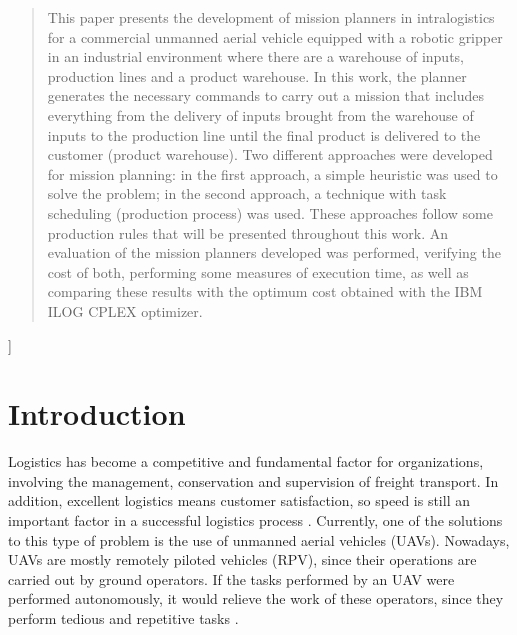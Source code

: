 \documentclass[conference,harvard,brazil,english]{sbatex}
\begin{document}
\begin{abstract}
 This paper presents the development of mission planners in intralogistics for a commercial unmanned aerial vehicle equipped with a robotic gripper in an industrial environment where there are a warehouse of inputs, production lines and a product warehouse. In this work, the planner generates the necessary commands to carry out a mission that includes everything from the delivery of inputs brought from the warehouse of inputs to the production line until the final product is delivered to the customer (product warehouse). Two different approaches were developed for mission planning: in the first approach, a simple heuristic was used to solve the problem; in the second approach, a technique with task scheduling (production process) was used. These approaches follow some production rules that will be presented throughout this work. An evaluation of the mission planners developed was performed, verifying the cost of both, performing some measures of execution time, as well as comparing these results with the optimum cost obtained with the IBM ILOG CPLEX optimizer.
\end{abstract}

]


\section{Introduction}
\label{sec:introduction}


Logistics has become a competitive and fundamental factor for organizations, involving the management, conservation and supervision of freight transport. In addition, excellent logistics means customer satisfaction, so speed is still an important factor in a successful logistics process \cite{drone4logistic}. Currently, one of the solutions to this type of problem is the use of unmanned aerial vehicles (UAVs). Nowadays, UAVs are mostly remotely piloted vehicles (RPV), since their operations are carried out by ground operators. If the tasks performed by an UAV were performed autonomously, it would relieve the work of these operators, since they perform tedious and repetitive tasks \cite{pascarella2013autonomic}.
\end{document}
